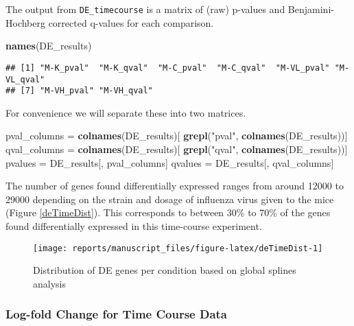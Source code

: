 \documentclass[9pt,a4paper,]{extarticle}
\newenvironment{Shaded}{\begin{snugshade}}{\end{snugshade}}
\newcommand{\KeywordTok}[1]{\textcolor[rgb]{0.13,0.29,0.53}{\textbf{#1}}}
\newcommand{\NormalTok}[1]{#1}
\newcommand{\StringTok}[1]{\textcolor[rgb]{0.31,0.60,0.02}{#1}}
\begin{document}
The output from \texttt{DE\_timecourse} is a matrix of (raw) p-values and Benjamini-Hochberg corrected q-values for each comparison.

\begin{Shaded}
\begin{Highlighting}[]
\KeywordTok{names}\NormalTok{(DE_results)}
\end{Highlighting}
\end{Shaded}

\begin{verbatim}
## [1] "M-K_pval"  "M-K_qval"  "M-C_pval"  "M-C_qval"  "M-VL_pval" "M-VL_qval"
## [7] "M-VH_pval" "M-VH_qval"
\end{verbatim}

For convenience we will separate these into two matrices.

\begin{Shaded}
\begin{Highlighting}[]
\NormalTok{pval_columns =}\StringTok{ }\KeywordTok{colnames}\NormalTok{(DE_results)[}
    \KeywordTok{grepl}\NormalTok{(}\StringTok{"pval"}\NormalTok{, }\KeywordTok{colnames}\NormalTok{(DE_results))]}
\NormalTok{qval_columns =}\StringTok{ }\KeywordTok{colnames}\NormalTok{(DE_results)[}
    \KeywordTok{grepl}\NormalTok{(}\StringTok{"qval"}\NormalTok{, }\KeywordTok{colnames}\NormalTok{(DE_results))]}
\NormalTok{pvalues =}\StringTok{ }\NormalTok{DE_results[, pval_columns]}
\NormalTok{qvalues =}\StringTok{ }\NormalTok{DE_results[, qval_columns]}
\end{Highlighting}
\end{Shaded}

The number of genes found differentially expressed ranges from around 12000 to
29000 depending on the strain and dosage of influenza virus given to the mice
(Figure \ref{deTimeDist}).
This corresponds to between 30\% to 70\% of the genes found differentially
expressed in this time-course experiment.

\begin{figure}[H]

{\centering \texttt{[image: reports/manuscript\_files/figure-latex/deTimeDist-1]} 

}

\caption{Distribution of DE genes per condition based on global splines analysis}\label{fig:deTimeDist}
\end{figure}

\hypertarget{log-fold-change-for-time-course-data}{%
\subsubsection{Log-fold Change for Time Course Data}\label{log-fold-change-for-time-course-data}}
\end{document}
